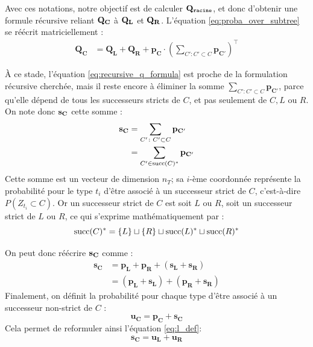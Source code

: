 Avec ces notations, notre objectif est de calculer $\bf{Q_\texttt{racine}}$, et donc d'obtenir une formule récursive reliant $\bf{Q_C}$ à $\bf{Q_L}$ et $\bf{Q_R}$. L'équation \ref{eq:proba_over_subtree} se réécrit matriciellement :
\begin{align}
    \mathbf{Q_C} &= \mathbf{Q_L} + \mathbf{Q_R} + \mathbf{p_C} \cdot \left(\sum_{C' \colon C' \subset C} \mathbf{p_{C'}} \right)^\top 
    \label{eq:recursive_q_formula}
\end{align}

À ce stade, l'équation \ref{eq:recursive_q_formula} est proche de la formulation récursive cherchée, mais il reste encore à éliminer la somme $\sum_{C' \colon C' \subset C} \mathbf{p_{C'}}$, parce qu'elle dépend de tous les successeurs stricts de $C$, et pas seulement de $C, L$ ou $R$. On note donc $\bf{s_C}$ cette somme :
\begin{align}
    \bf{s_C} &= \sum_{C' \colon C' \subset C} \mathbf{p_{C'}} \nonumber \\
            &= \sum_{C' \in \succs(C)^*} \mathbf{p_{C'}}
\end{align}
Cette somme est un vecteur de dimension $n_T$; sa $i$-ème coordonnée représente la probabilité pour le type $t_i$ d'être associé à un successeur strict de $C$, c'est-à-dire $P(Z_{t_i} \subset C)$. Or un successeur strict de $C$ est soit $L$ ou $R$, soit un successeur strict de $L$ ou $R$, ce qui s'exprime mathématiquement par :
\begin{equation}
    \succs(C)^* = \{L\} \sqcup \{R\} \sqcup \succs(L)^* \sqcup \succs(R)^*
\end{equation}

On peut donc réécrire $\bf{s_C}$ comme :
\begin{align}
    \mathbf{s_C} &= \mathbf{p_L} + \mathbf{p_R} + (\mathbf{s_L} + \mathbf{s_R}) \nonumber  \\
     &= (\mathbf{p_L}  + \mathbf{s_L}) + (\mathbf{p_R} + \mathbf{s_R})
    \label{eq:l_def}
\end{align}
Finalement, on définit la probabilité pour chaque type d'être associé à un successeur non-strict de $C$ : 
\begin{equation}
    \mathbf{u_C} = \mathbf{p_C} + \mathbf{s_C}
    \label{eq:def_uc}
\end{equation}
Cela permet de reformuler ainsi l'équation \ref{eq:l_def}:
\begin{equation}
    \mathbf{s_C} = \mathbf{u_L} + \mathbf{u_R}
    \label{eq:l_update}
\end{equation}

